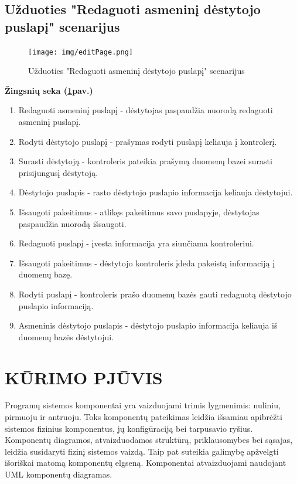 \documentclass{VUMIFPSkursinis}
\begin{document}
\subsection{Užduoties "Redaguoti asmeninį dėstytojo puslapį" scenarijus}
\begin{figure}[H]
	\centering
	\texttt{[image: img/editPage.png]}
	\caption{Užduoties  "Redaguoti asmeninį dėstytojo puslapį" scenarijus}
	\label{fig:editPage}
\end{figure}
\textbf{Žingsnių seka (\ref{fig:editPage}pav.)}\\
\begin{enumerate}
	\item Redaguoti asmeninį puslapį - dėstytojas paspaudžia nuorodą redaguoti asmeninį puslapį.
	\item Rodyti dėstytojo puslapį - prašymas rodyti puslapį keliauja į kontrolerį.
	\item Surasti dėstytoją - kontroleris pateikia prašymą duomenų bazei surasti prisijungusį dėstytoją.
	\item Dėstytojo puslapis - rasto dėstytojo puslapio informacija keliauja dėstytojui.
	\item Išsaugoti pakeitimus - atlikęs pakeitimus savo puslapyje, dėstytojas paspaudžia nuorodą išsaugoti.
	\item Redaguoti puslapį - įvesta informacija yra siunčiama kontroleriui.
	\item Išsaugoti pakeitimus - dėstytojo kontroleris įdeda pakeistą informaciją į duomenų bazę.
	\item Rodyti puslapį - kontroleris prašo duomenų bazės gauti redaguotą dėstytojo puslapio informaciją.
	\item Asmeninis dėstytojo puslapis - dėstytojo puslapio informacija keliauja iš duomenų bazės dėstytojui.
\end{enumerate}
\newpage
\section{KŪRIMO PJŪVIS}
Programų sistemos komponentai yra vaizduojami trimis lygmenimis: nuliniu, pirmuoju ir antruoju. Toks komponentų pateikimas leidžia išsamiau apibrėžti sistemos fizinius komponentus, jų konfigūraciją bei tarpusavio ryšius. Komponentų diagramos, atvaizduodamos struktūrą, priklausomybes bei sąsajas, leidžia susidaryti fizinį sistemos vaizdą. Taip pat suteikia galimybę apžvelgti išoriškai matomą komponentų elgseną. Komponentai atvaizduojami naudojant UML komponentų diagramas.
\end{document}
